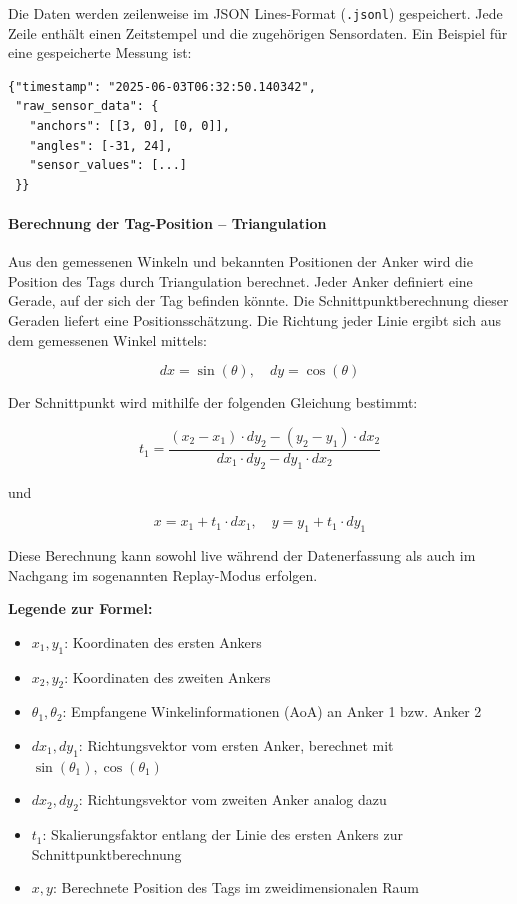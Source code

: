 \documentclass[a4paper, 12pt]{article} %
\begin{document}
Die Daten werden zeilenweise im \ac{JSON} Lines-Format (\texttt{.jsonl}) gespeichert. Jede Zeile enthält einen Zeitstempel und die zugehörigen Sensordaten. 
Ein Beispiel für eine gespeicherte Messung ist:

\begin{verbatim}
{"timestamp": "2025-06-03T06:32:50.140342", 
 "raw_sensor_data": {
   "anchors": [[3, 0], [0, 0]], 
   "angles": [-31, 24], 
   "sensor_values": [...]
 }}
\end{verbatim}

\paragraph{Berechnung der Tag-Position – Triangulation}

Aus den gemessenen Winkeln und bekannten Positionen der Anker wird die Position des Tags durch Triangulation berechnet. Jeder Anker 
definiert eine Gerade, auf der sich der Tag befinden könnte. Die Schnittpunktberechnung dieser Geraden liefert eine Positionsschätzung. Die Richtung 
jeder Linie ergibt sich aus dem gemessenen Winkel mittels:

\[
dx = \sin(\theta), \quad dy = \cos(\theta)
\]

Der Schnittpunkt wird mithilfe der folgenden Gleichung bestimmt:

\[
t_1 = \frac{(x_2 - x_1) \cdot dy_2 - (y_2 - y_1) \cdot dx_2}{dx_1 \cdot dy_2 - dy_1 \cdot dx_2}
\]

und

\[
x = x_1 + t_1 \cdot dx_1, \quad y = y_1 + t_1 \cdot dy_1
\]

Diese Berechnung kann sowohl live während der Datenerfassung als auch im Nachgang im sogenannten Replay-Modus erfolgen.

\vspace{1em}
\textbf{Legende zur Formel:}
\begin{itemize}
    \item $x_1, y_1$: Koordinaten des ersten Ankers
    \item $x_2, y_2$: Koordinaten des zweiten Ankers
    \item $\theta_1, \theta_2$: Empfangene Winkelinformationen (\ac{AoA}) an Anker 1 bzw. Anker 2
    \item $dx_1, dy_1$: Richtungsvektor vom ersten Anker, berechnet mit $\sin(\theta_1), \cos(\theta_1)$
    \item $dx_2, dy_2$: Richtungsvektor vom zweiten Anker analog dazu
    \item $t_1$: Skalierungsfaktor entlang der Linie des ersten Ankers zur Schnittpunktberechnung
    \item $x, y$: Berechnete Position des Tags im zweidimensionalen Raum
\end{itemize}
\end{document}
